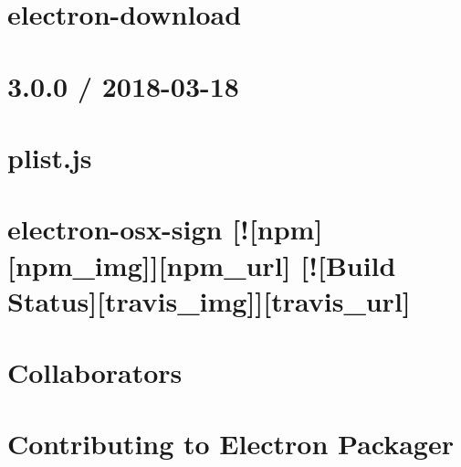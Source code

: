 \documentclass[twoside]{book}
\newcommand{\+}{\discretionary{\mbox{\scriptsize$\hookleftarrow$}}{}{}}
\begin{document}
\chapter{electron-\/download}
\label{md_dsmacc_vis_degree_node_modules_electron-download_readme}

\chapter{3.0.0 / 2018-\/03-\/18}
\label{md_dsmacc_vis_degree_node_modules_electron-osx-sign_node_modules_plist_History}

\chapter{plist.\+js}
\label{md_dsmacc_vis_degree_node_modules_electron-osx-sign_node_modules_plist_README}

\chapter{electron-\/osx-\/sign \mbox{[}!\mbox{[}npm\mbox{]}\mbox{[}npm\+\_\+img\mbox{]}\mbox{]}\mbox{[}npm\+\_\+url\mbox{]} \mbox{[}!\mbox{[}Build Status\mbox{]}\mbox{[}travis\+\_\+img\mbox{]}\mbox{]}\mbox{[}travis\+\_\+url\mbox{]}}
\label{md_dsmacc_vis_degree_node_modules_electron-osx-sign_README}

\chapter{Collaborators}
\label{md_dsmacc_vis_degree_node_modules_electron-packager_collaborators}

\chapter{Contributing to Electron Packager}
\label{md_dsmacc_vis_degree_node_modules_electron-packager_CONTRIBUTING}

\end{document}
